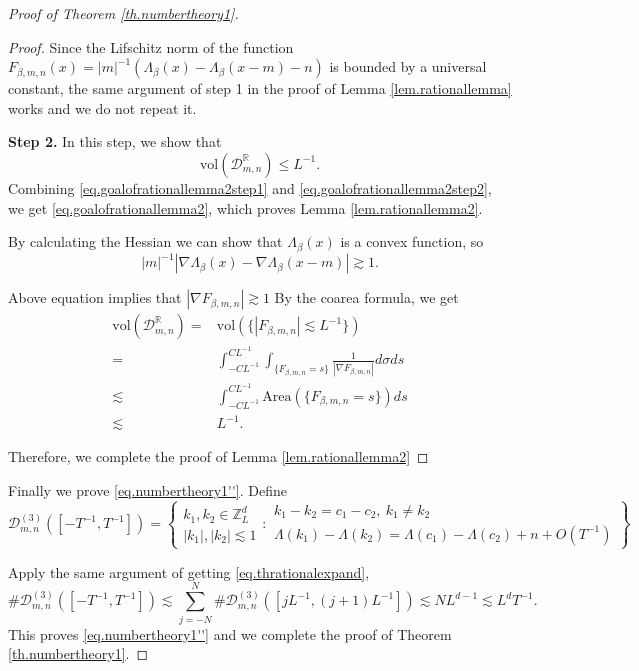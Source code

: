 \begin{proof}[Proof of Theorem \ref{th.numbertheory1}]
\begin{proof}
Since the Lifschitz norm of the function $F_{\beta,m,n}(x)=|m|^{-1}(\Lambda_{\beta}(x)-\Lambda_{\beta}(x-m)-n)$ is bounded by a universal constant, the same argument of step 1 in the proof of Lemma \ref{lem.rationallemma} works and we do not repeat it.

\textbf{Step 2.} In this step, we show that 
\begin{equation}\label{eq.goalofrationallemma2step2}
    \text{vol}(\mathcal{D}^{\mathbb{R}}_{m,n})\le L^{-1}.
\end{equation}
Combining \eqref{eq.goalofrationallemma2step1} and \eqref{eq.goalofrationallemma2step2}, we get
\eqref{eq.goalofrationallemma2}, which proves Lemma \ref{lem.rationallemma2}.


By calculating the Hessian we can show that $\Lambda_{\beta}(x)$ is a convex function, so
\begin{equation}
    |m|^{-1}\left|\nabla\Lambda_{\beta}(x)-\nabla\Lambda_{\beta}(x-m)\right|\gtrsim 1.
\end{equation}

Above equation implies that $|\nabla F_{\beta,m,n}|\gtrsim 1$ By the coarea formula, we get
\begin{equation}
\begin{split}
    \text{vol}(\mathcal{D}^{\mathbb{R}}_{m,n}) =&  \text{vol}(\{|F_{\beta,m,n}|\lesssim L^{-1}\})
    \\
    =& \int^{CL^{-1}}_{-CL^{-1}} \int_{\{F_{\beta,m,n}=s\}}\frac{1}{|\nabla F_{\beta,m,n}|}d\sigma ds
    \\
    \lesssim& \int^{CL^{-1}}_{-CL^{-1}} \text{Area}(\{F_{\beta,m,n}=s\}) ds
    \\
    \lesssim& L^{-1}.
\end{split}
\end{equation}


Therefore, we complete the proof of Lemma \ref{lem.rationallemma2}

\end{proof}

Finally we prove \eqref{eq.numbertheory1''}. Define
\begin{equation}
    \mathcal{D}^{(3)}_{m,n}([-T^{-1},T^{-1} ])=\left\{\begin{matrix}
k_1,k_2\in\mathbb{Z}_L^d \\
|k_1|, |k_2|\lesssim 1
\end{matrix}
:
\begin{matrix}
k_1- k_2=c_1- c_{2},\ k_1\ne k_2 \\
\Lambda(k_1)-\Lambda(k_2)=\Lambda(c_1)- \Lambda(c_2)+n+O(T^{-1})
\end{matrix}
\right\}
\end{equation}

Apply the same argument of getting \eqref{eq.thrationalexpand},
\begin{equation}
    \#\mathcal{D}^{(3)}_{m,n}([-T^{-1},T^{-1} ])\lesssim \sum_{j=-N}^N\#\mathcal{D}^{(3)}_{m,n}([jL^{-1}, (j+1)L^{-1}])\lesssim NL^{d-1}\lesssim L^dT^{-1}.
\end{equation}
This proves \eqref{eq.numbertheory1''} and we complete the proof of Theorem \ref{th.numbertheory1}.
\end{proof}
